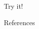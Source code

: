\documentclass[final]{beamer}
\begin{document}
\begin{frame}{}
\begin{columns}[t]
\begin{column}{.45\linewidth}
\begin{block}{Try it!}
\end{block}


\begin{block}{References}
	\footnotesize
	
\end{block}    


\vfill


\end{column}


\end{columns}

\vfill

\end{frame}
\end{document}
